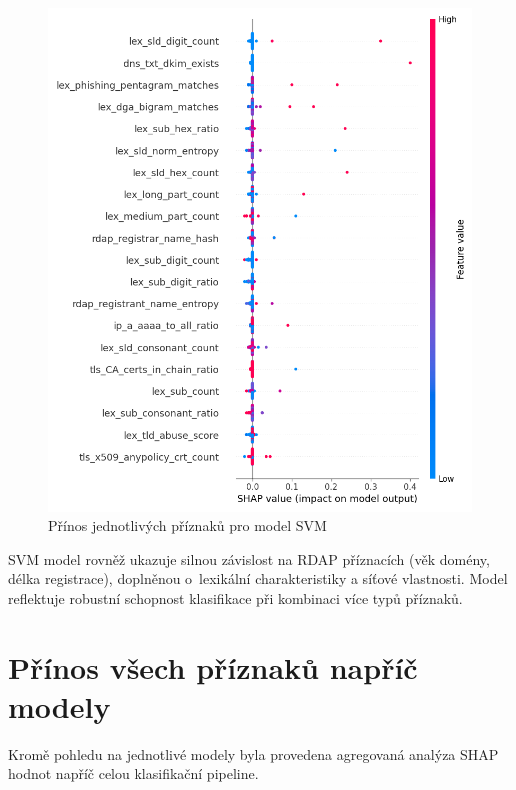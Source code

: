 \begin{figure}[!ht]
    \centering
    \includegraphics[width=1.0\textwidth]{obrazky-figures/shap_svm.png}
    \caption{Přínos jednotlivých příznaků pro model SVM}
    \label{fig:shap_svm}
\end{figure}

SVM model rovněž ukazuje silnou závislost na RDAP příznacích (věk domény, délka registrace), doplněnou o~lexikální charakteristiky a síťové vlastnosti. Model reflektuje robustní schopnost klasifikace při kombinaci více typů příznaků.

\section*{Přínos všech příznaků napříč modely}

Kromě pohledu na jednotlivé modely byla provedena agregovaná analýza SHAP hodnot napříč celou klasifikační pipeline.

